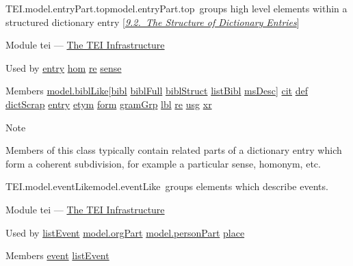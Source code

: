\begin{reflist}
\item[]\begin{specHead}{TEI.model.entryPart.top}{model.entryPart.top} groups high level elements within a structured dictionary entry [\textit{\hyperref[DIEN]{9.2.\ The Structure of Dictionary Entries}}]\end{specHead} 
    \item[{Module}]
  tei — \hyperref[ST]{The TEI Infrastructure}
    \item[{Used by}]
  \hyperref[TEI.entry]{entry} \hyperref[TEI.hom]{hom} \hyperref[TEI.re]{re} \hyperref[TEI.sense]{sense}
    \item[{Members}]
  \hyperref[TEI.model.biblLike]{model.biblLike}[\hyperref[TEI.bibl]{bibl} \hyperref[TEI.biblFull]{biblFull} \hyperref[TEI.biblStruct]{biblStruct} \hyperref[TEI.listBibl]{listBibl} \hyperref[TEI.msDesc]{msDesc}] \hyperref[TEI.cit]{cit} \hyperref[TEI.def]{def} \hyperref[TEI.dictScrap]{dictScrap} \hyperref[TEI.entry]{entry} \hyperref[TEI.etym]{etym} \hyperref[TEI.form]{form} \hyperref[TEI.gramGrp]{gramGrp} \hyperref[TEI.lbl]{lbl} \hyperref[TEI.re]{re} \hyperref[TEI.usg]{usg} \hyperref[TEI.xr]{xr}
    \item[{Note}]
  \par
Members of this class typically contain related parts of a dictionary entry which form a coherent subdivision, for example a particular sense, homonym, etc. 
\end{reflist}  
\begin{reflist}
\item[]\begin{specHead}{TEI.model.eventLike}{model.eventLike} groups elements which describe events.\end{specHead} 
    \item[{Module}]
  tei — \hyperref[ST]{The TEI Infrastructure}
    \item[{Used by}]
  \hyperref[TEI.listEvent]{listEvent} \hyperref[TEI.model.orgPart]{model.orgPart} \hyperref[TEI.model.personPart]{model.personPart} \hyperref[TEI.place]{place}
    \item[{Members}]
  \hyperref[TEI.event]{event} \hyperref[TEI.listEvent]{listEvent}
\end{reflist}  
